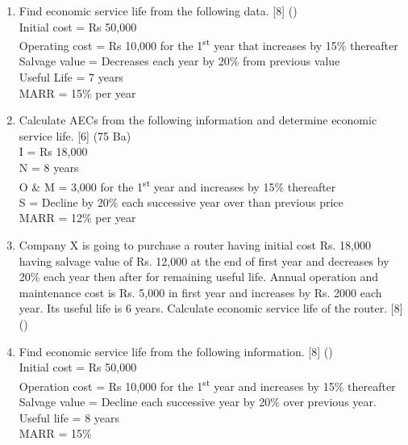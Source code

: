 \documentclass[12pt]{article}
\newcommand{\super}[1]{\textsuperscript{#1}}
\begin{document}
\begin{enumerate}
			\item Find economic service life from the following data. \hfill [8] ()\\
			Initial cost = Rs 50,000 \\
			Operating cost = Rs 10,000 for the 1\super{st} year that increases by 15\% thereafter \\
			Salvage value = Decreases each year by 20\% from previous value \\
			Useful Life = 7 years \\
			MARR = 15\% per year

			\item Calculate AECs from the following information and determine economic service life. \hfill [6] (75 Ba)\\
			I = Rs 18,000 \\
			N = 8 years \\
			O \& M = 3,000 for the 1\super{st} year and increases by 15\% thereafter \\
			S = Decline by 20\% each successive year over than previous price \\
			MARR = 12\% per year

			\item Company X is going to purchase a router having initial cost Rs. 18,000 having salvage value of Rs. 12,000 at the end of first year and decreases by 20\% each year then after for remaining useful life. Annual operation and maintenance cost is Rs. 5,000 in first year and increases by Rs. 2000 each year. Its useful life is 6 years. Calculate economic service life of the router. \hfill [8] ()

			\item Find economic service life from the following information. \hfill [8] () \\
			Initial cost = Rs 50,000 \\
			Operation cost = Rs 10,000 for the 1\super{st} year and increases by 15\% thereafter \\
			Salvage value = Decline each successive year by 20\% over previous year. \\
			Useful life = 8 years \\
			MARR = 15\%


\end{enumerate}
\end{document}
